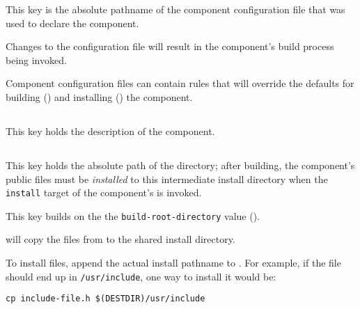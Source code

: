 This key is the absolute pathname of the component configuration file
that was used to declare the component.

Changes to the configuration file will result in the component's build
process being invoked.

Component configuration files can contain \makefile rules that will
override the defaults for building
() and installing
() the component.


\subsection{}\label{variables:description}

This key holds the description of the component.


\subsection{}\label{variables:destdir-directory}

This key holds the absolute path of the \destdir directory; after
building, the component's public files must be \emph{installed} to this
intermediate install directory when the \texttt{install} target of the
component's \makefile is invoked.

This key builds on the the \texttt{build-root-directory} value
().

\lmsbw will copy the files from \destdir to the shared install directory.

To install files, append the actual install pathname to \destdir.  For
example, if the file should end up in \texttt{/usr/include}, one way
to install it would be:

\begin{verbatim}
cp include-file.h $(DESTDIR)/usr/include
\end{verbatim}


\subsection{}\label{variables:hash}

